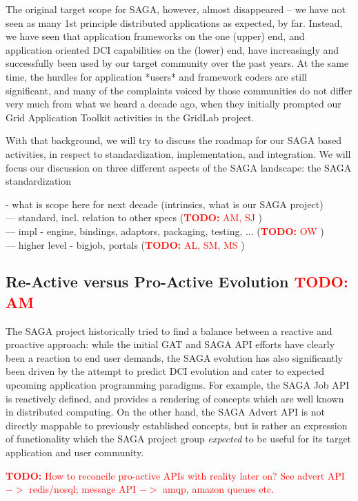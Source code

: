 \documentclass{article}
\newcommand{\I}[1]{\textit{#1}}
\newcommand{\B}[1]{\textbf{#1}}
\newcommand{\nind}{\noindent}
\newcommand{\todo}[1]{{\textcolor{red}{\B{TODO:} #1 }}}
\begin{document}
 The original target scope for SAGA, however, almost disappeared -- we
 have not seen as many 1st principle distributed applications as
 expected, by far.  Instead, we have seen that application frameworks
 on the one (upper) end, and application oriented DCI capabilities on
 the (lower) end, have increasingly and successfully been used by our
 target community over the past years.  At the same time, the hurdles
 for application *users* and framework coders are still significant,
 and many of the complaints voiced by those communities do not differ
 very much from what we heard a decade ago, when they initially
 prompted our Grid Application Toolkit activities in the GridLab
 project.

 With that background, we will try to discuss the roadmap for our SAGA
 based activities, in respect to standardization, implementation, and
 integration.  We will focus our discussion on three different aspects
 of the SAGA landscape: the SAGA standardization 

 \nind
 - what is scope here for next decade (intrinsics, what is our SAGA project)\\
 --- standard, incl. relation to other specs (\todo{AM, SJ} )\\
 --- impl - engine, bindings, adaptors, packaging, testing, ... (\todo{OW})\\
 --- higher level - bigjob, portals (\todo{AL, SM, MS})\\
      

 \subsection{Re-Active versus Pro-Active Evolution \todo{AM}}

  The SAGA project historically tried to find a balance between a
  reactive and proactive approach: while the initial GAT and SAGA API
  efforts have clearly been a reaction to end user demands, the SAGA
  evolution has also significantly been driven by the attempt to
  predict DCI evolution and cater to expected upcoming application
  programming paradigms.  For example, the SAGA Job API is reactively
  defined, and provides a rendering of concepts which are well known
  in distributed computing.  On the other hand, the SAGA Advert API is
  not directly mappable to previously established concepts, but is
  rather an expression of functionality which the SAGA project group
  \I{expected} to be useful for its target application and user
  community.

  \todo{How to reconcile pro-active APIs with reality later on?  See
  advert API $->$ redis/nosql; message API $->$ amqp, amazon queues
  etc.}
  
\end{document}
